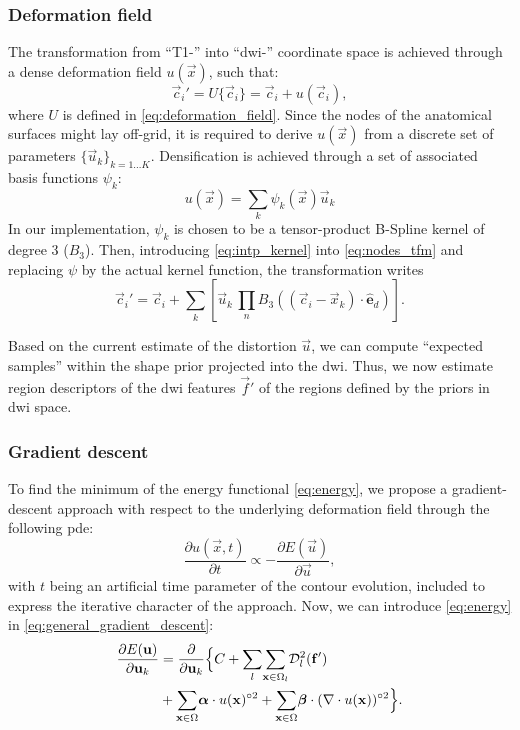 \subsubsection{Deformation field}
\label{sec:deformation_field}
The transformation from ``T1-'' into ``\gls{dwi}-'' coordinate space is 
achieved through a dense deformation field $u(\vec{x})$, such that:
\begin{equation}
\vec{c}_i' = U\{\vec{c}_i\} = \vec{c}_i + u(\vec{c}_i),
\label{eq:nodes_tfm}
\end{equation}
where $U$ is defined in \eqref{eq:deformation_field}. Since the nodes of the anatomical 
surfaces might lay off-grid, it is required to derive $u(\vec{x})$ from a discrete 
set of parameters $\{\vec{u}_k\}_{k=1 \ldots K}$. Densification is achieved through 
a set of associated basis functions $\psi_k$:
%
\begin{equation}
u(\vec{x}) = \sum_k \psi_k(\vec{x}) \vec{u}_k
\label{eq:intp_kernel}
\end{equation}
%
In our implementation, $\psi_k$ is chosen to be a tensor-product B-Spline kernel
of degree 3 ($B_3$).
Then, introducing \eqref{eq:intp_kernel} into \eqref{eq:nodes_tfm} and replacing
$\psi$ by the actual kernel function, the transformation writes
%
\begin{equation}
\vec{c}_i' = \vec{c}_i + \sum_k \left[ \vec{u}_k \, \underset{n}{\prod} B_3( (\vec{c}_i - \vec{x}_k) \cdot \hat{\mathbf{e}}_d ) \right].
\label{eq:transformation}
\end{equation} 

Based on the current estimate of the distortion $\vec{u}$, we can compute 
``expected samples'' within the shape prior projected into the \gls{dwi}.
Thus, we now estimate region descriptors of the \gls{dwi} features 
$\vec{f}'$ of the regions defined by the priors in \gls{dwi} space.

\subsubsection{Gradient descent}
To find the minimum of the energy functional \eqref{eq:energy},
we propose a gradient-descent approach with respect to the underlying 
deformation field through the following \gls*{pde}:
\begin{equation}
\frac{\partial u(\vec{x},t)}{\partial t} \propto - \frac{\partial E(\vec{u})}{\partial \vec{u}},
\label{eq:general_gradient_descent}
\end{equation}
with $t$ being an artificial time parameter of the contour
evolution, included to express the iterative character of the approach.
Now, we can introduce \eqref{eq:energy} in
\eqref{eq:general_gradient_descent}:
\begin{align}
\frac{\partial E(\vec{u})}{\partial \vec{u}_k} &=
\frac{ \partial }{\partial \vec{u}_k} \Big\{
C + \underset{l}{\sum}
\underset{\vec{x} \in \Omega_l}{\sum} \mdist{f'}{l} \notag\\
&+ \underset{\vec{x} \in \Omega}{\sum} \boldsymbol{\alpha} \cdot u(\vec{x})^{\circ2}
+ \underset{\vec{x} \in \Omega}{\sum} \boldsymbol{\beta} \cdot (\nabla \cdot u(\vec{x}))^{\circ2}
\Big\}.
\label{eq:gradient_descent}
\end{align}

